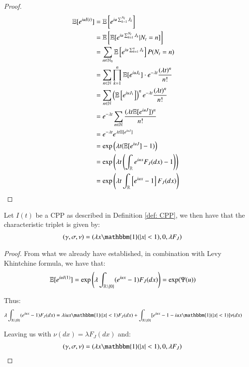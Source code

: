 \begin{proof}

\begin{align*}
\mathbb{E}[e^{iuI(t)}] &= 
\mathbb{E}\left[
e^{iu \sum_{k=1}^{N_{t}}J_{k}}
\right] \\
&= 
\mathbb{E}\left[\mathbb{E}[e^{iu \sum_{k=1}^{N_{t}}J_{k}}|N_{t}=n]\right] \\ 
&= 
\sum_{n\in \mathbb{N}_{0}}\mathbb{E}\left[e^{iu\sum_{k=1}^{n}J_{k}}\right]P(N_{t}=n) \\
&= 
\sum_{n\in \mathbb{N}}\prod_{k=1}^{n}\mathbb{E}[e^{iuJ_{k}}]\cdot e^{-\lambda t}\frac{(\lambda t)^{n}}{n!} \\ 
&= 
\sum_{n\in \mathbb{N}}\left(
\mathbb{E}\left[e^{iuJ_{1}}\right]
\right)^{n}e^{-\lambda t}\frac{(\lambda t)^{n}}{n!} \\ 
&= 
e^{-\lambda t}\sum_{n \in \mathbb{N}}\frac{
(\lambda t \mathbb{E}[e^{iuJ}])^{n}
}{
n!
} \\ 
&= e^{-\lambda t}e^{\lambda t \mathbb{E}[e^{iuJ}]} \\ 
&= \exp\left(
\lambda t(\mathbb{E}[e^{iuJ}] -1)
\right) \\ 
&= 
\exp\left(
\lambda t \left(\int_{\mathbb{R}}e^{iux}F_{J}(dx) - 1\right) 
\right) \\ 
&= 
\exp\left(
\lambda t \int_{\mathbb{R}}\left[e^{iux}-1 \right]F_{J}(dx)
\right)
\end{align*}

\end{proof}

\newpage 

\begin{proposition}
Let $I(t)$ be a CPP as described in Definition \ref{def: CPP}, we then have that the characteristic triplet is given by:
\begin{align*}
(\gamma, \sigma, \nu) &= 
(\lambda x \mathbbm{1}(|x|<1), 0, \lambda F_{J})
\end{align*}
\end{proposition}

\begin{proof}
From what we already have established, in combination with Levy Khintchine formula, we have that: 
\begin{align*}
\mathbb{E}[e^{iuI(1)}] &= 
\exp\left(
\lambda\int_{\mathbb{R}\setminus\{0\}}(e^{iux}-1)F_{J}(dx)
\right)    
 = \exp(\Psi(u))   
\end{align*}

Thus: 
\begin{align*}
\lambda\int_{\R\setminus\{0\}}(e^{iux}-1)F_{J}(dx)
&= 
\lambda iux\mathbbm{1}(|x|<1)F_{J}(dx) + 
\int_{\R\setminus\{0\}}[e^{iux}-1-iux\mathbbm{1}(|x|<1)]\nu(dx)
\end{align*}

Leaving us with $\nu(dx) = \lambda F_{J}(dx)$ and: 
\begin{align*}
(\gamma, \sigma, \nu) &= 
(\lambda x \mathbbm{1}(|x|<1), 0, \lambda F_{J})    
\end{align*}
\end{proof}

